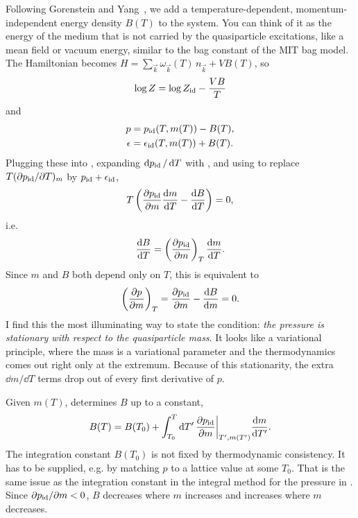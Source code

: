 Following Gorenstein and Yang~\cite{gorenstein_gluon_1995}, we add a
temperature-dependent, momentum-independent energy density $B(T)$ to
the system. You can think of it as the energy of the medium that is not
carried by the quasiparticle excitations, like a mean field or vacuum
energy, similar to the bag constant of the MIT bag model. The Hamiltonian
becomes $H=\sum_{\vec{k}}\omega_{\vec{k}}(T)\,n_{\vec{k}}+VB(T)$, so
\begin{equation}
  \log Z=\log Z_{\rm id}-\frac{VB}{T}
\end{equation}
and
\begin{equation}\begin{aligned}\label{eq:qpPE}
  p&=p_{\rm id}(T,m(T))-B(T),\\
  \epsilon&=\epsilon_{\rm id}(T,m(T))+B(T).
\end{aligned}\end{equation}
Plugging these into , expanding $\dd{p_{\rm id}}/\dd{T}$
with , and using  to replace
$T(\partial p_{\rm id}/\partial T)_m$ by $p_{\rm id}+\epsilon_{\rm id}$,
\begin{equation}
  T\left(\pdv{p_{\rm id}}{m}\dv{m}{T}-\dv{B}{T}\right)=0,
\end{equation}
i.e.
\begin{equation}\label{eq:qpBcondition}
  \dv{B}{T}=\left(\pdv{p_{\rm id}}{m}\right)_{T}\dv{m}{T}.
\end{equation}
Since $m$ and $B$ both depend only on $T$, this is equivalent to
\begin{equation}\label{eq:qpstationary}
  \left(\pdv{p}{m}\right)_{T}=\pdv{p_{\rm id}}{m}-\dv{B}{m}=0.
\end{equation}
I find this the most illuminating way to state the condition: {\it the
pressure is stationary with respect to the quasiparticle mass}. It looks
like a variational principle, where the mass is a variational parameter
and the thermodynamics comes out right only at the extremum. Because of
this stationarity, the extra $\dd{m}/\dd{T}$ terms drop out of every
first derivative of $p$.

Given $m(T)$,  determines $B$ up to a constant,
\begin{equation}\label{eq:qpB}
  B(T)=B(T_0)+\int_{T_0}^T\dd{T'}
     \pdv{p_{\rm id}}{m}\bigg|_{T',m(T')}\dv{m}{T'}.
\end{equation}
The integration constant $B(T_0)$ is not fixed by thermodynamic
consistency. It has to be supplied, e.g. by matching $p$ to a lattice
value at some $T_0$. That is the same issue as the integration constant
in the integral method for the pressure in . Since
$\partial p_{\rm id}/\partial m<0$, $B$ decreases where $m$ increases
and increases where $m$ decreases.


